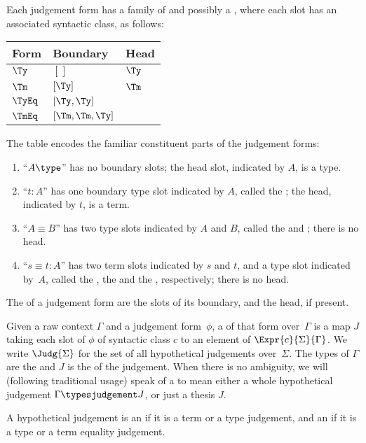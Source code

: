 Each judgement form has a family of  and possibly a , where each slot has an associated syntactic class, as follows:
%
\begin{center}
\begin{tabular}{lll}
  Form & Boundary & Head \\
  \midrule
  $\Ty$ & $[]$ & $\Ty$ \\
  $\Tm$ & $[\Ty]$ & $\Tm$ \\
  $\TyEq$ & $[\Ty, \Ty]$ & \\
  $\TmEq$ & $[\Tm, \Tm, \Ty]$ & \\
\end{tabular}
\end{center}
%
The table encodes the familiar constituent parts of the judgement forms:
%
\begin{enumerate}
\item ``$A \type$'' has no boundary slots; the head slot, indicated by $A$, is a type.
\item ``$t : A$'' has one boundary type slot indicated by $A$, called the ; the head, indicated by $t$, is a term.
\item ``$A \equiv B$'' has two type slots indicated by $A$ and $B$, called the  and ; there is no head.
\item ``$s \equiv t : A$'' has two term slots indicated by $s$ and $t$, and a type slot indicated by~$A$, called the , the  and the , respectively; there is no head.
\end{enumerate}
%
The  of a judgement form are the slots of its boundary, and the head, if present.

\begin{definition}
  \label{def:judgement}
  Given a raw context $\Gamma$ and a judgement form~$\phi$, a  of that form over~$\Gamma$ is a map $J$ taking each slot of $\phi$ of syntactic class $c$ to an element of $\Expr{c}{\Sigma}{\Gamma}$.
  We write $\Judg{\Sigma}$ for the set of all hypothetical judgements over~$\Sigma$.
  The types of $\Gamma$ are the  and $J$ is the  of the judgement.
  When there is no ambiguity, we will (following traditional usage) speak of a  to mean either a whole hypothetical judgement $\Gamma \typesjudgement J$, or just a thesis $J$.
 
  A hypothetical judgement is an  if it is a term or a type judgement, and an  if it is a type or a term equality judgement.
\end{definition}

